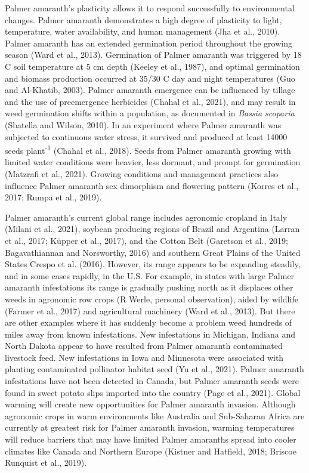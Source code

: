 \documentclass[utf8]{frontiersSCNS}
\begin{document}
Palmer amaranth's plasticity allows it to respond successfully to
environmental changes. Palmer amaranth demonstrates a high degree of
plasticity to light, temperature, water availability, and human
management (Jha et al., 2010). Palmer amaranth has an extended
germination period throughout the growing season (Ward et al., 2013).
Germination of Palmer amaranth was triggered by 18 C soil temperature at
5 cm depth (Keeley et al., 1987), and optimal germination and biomass
production occurred at 35/30 C day and night temperatures (Guo and
Al-Khatib, 2003). Palmer amaranth emergence can be influenced by tillage
and the use of preemergence herbicides (Chahal et al., 2021), and may
result in weed germination shifts within a population, as documented in
\emph{Bassia scoparia} (Sbatella and Wilson, 2010). In an experiment
where Palmer amaranth was subjected to continuous water stress, it
survived and produced at least 14000 seeds plant\textsuperscript{-1}
(Chahal et al., 2018). Seeds from Palmer amaranth growing with limited
water conditions were heavier, less dormant, and prompt for germination
(Matzrafi et al., 2021). Growing conditions and management practices
also influence Palmer amaranth sex dimorphism and flowering pattern
(Korres et al., 2017; Rumpa et al., 2019).

Palmer amaranth's current global range includes agronomic cropland in
Italy (Milani et al., 2021), soybean producing regions of Brazil and
Argentina (Larran et al., 2017; Küpper et al., 2017), and the Cotton
Belt (Garetson et al., 2019; Bagavathiannan and Norsworthy, 2016) and
southern Great Plains of the United States Crespo et al. (2016).
However, its range appears to be expanding steadily, and in some cases
rapidly, in the U.S. For example, in states with large Palmer amaranth
infestations its range is gradually pushing north as it displaces other
weeds in agronomic row crops (R Werle, personal observation), aided by
wildlife (Farmer et al., 2017) and agricultural machinery (Ward et al.,
2013). But there are other examples where it has suddenly become a
problem weed hundreds of miles away from known infestations. New
infestations in Michigan, Indiana and North Dakota appear to have
resulted from Palmer amaranth contaminated livestock feed. New
infestations in Iowa and Minnesota were associated with planting
contaminated pollinator habitat seed (Yu et al., 2021). Palmer amaranth
infestations have not been detected in Canada, but Palmer amaranth seeds
were found in sweet potato slips imported into the country (Page et al.,
2021). Global warming will create new opportunities for Palmer amaranth
invasion. Although agronomic crops in warm environments like Australia
and Sub-Saharan Africa are currently at greatest risk for Palmer
amaranth invasion, warming temperatures will reduce barriers that may
have limited Palmer amaranths spread into cooler climates like Canada
and Northern Europe (Kistner and Hatfield, 2018; Briscoe Runquist et
al., 2019).
\end{document}
